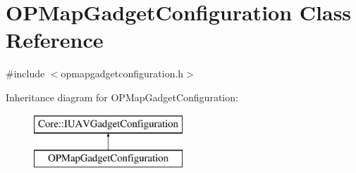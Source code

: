 \hypertarget{class_o_p_map_gadget_configuration}{\section{\-O\-P\-Map\-Gadget\-Configuration \-Class \-Reference}
\label{class_o_p_map_gadget_configuration}
}


{\ttfamily \#include $<$opmapgadgetconfiguration.\-h$>$}

\-Inheritance diagram for \-O\-P\-Map\-Gadget\-Configuration\-:\begin{figure}[H]
\begin{center}
\leavevmode
\includegraphics[height=2.000000cm]{class_o_p_map_gadget_configuration}
\end{center}
\end{figure}
